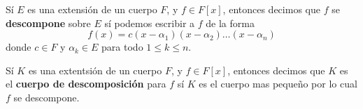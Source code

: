 \begin{definition}
    S\'i $E$ es una extensi\'on de un cuerpo  $F$, y  $f \in F[x]$, entonces
    decimos que $f$ se  \textbf{descompone} sobre $E$ s\'i podemos escribir a
    $f$ de la forma
    \begin{equation*}
        f(x)=c(x-\alpha_1)(x-\alpha_2) \dots (x-\alpha_n)
    \end{equation*}
    donde $c \in F$ y  $\alpha_k \in E$ para todo $1 \leq k \leq n$.
\end{definition}

\begin{definition}
    S\'i $K$ es una extentsi\'on de un cuerpo $F$, y $f \in F[x]$, entonces
    decimos que $K$ es el  \textbf{cuerpo de descomposici\'on} para $f$  s\'i
    $K$ es el cuerpo mas peque\~no por lo cual  $f$ se descompone.
\end{definition}

